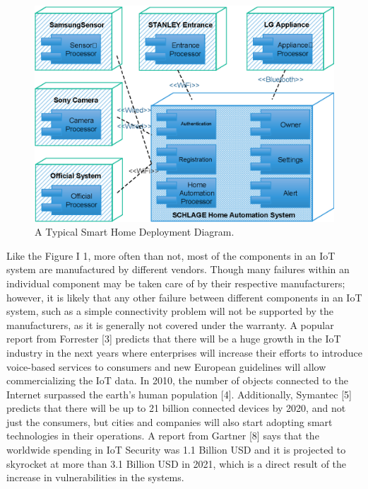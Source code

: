 \begin{figure}[h]
	\centering
	\includegraphics[width=\columnwidth]{images/shdd.eps}
	\caption{A Typical Smart Home Deployment Diagram.}
	\label{fig:SmartHomeDepDiagram}
\end{figure}

Like the Figure I 1, more often than not, most of the components in an IoT system are manufactured by different vendors. Though many failures within an individual component may be taken care of by their respective manufacturers; however, it is likely that any other failure between different components in an IoT system, such as a simple connectivity problem will not be supported by the manufacturers, as it is generally not covered under the warranty. A popular report from Forrester [3] predicts that there will be a huge growth in the IoT industry in the next years where enterprises will increase their efforts to introduce voice-based services to consumers and new European guidelines will allow commercializing the IoT data. In 2010, the number of objects connected to the Internet surpassed the earth’s human population [4]. Additionally, Symantec [5] predicts that there will be up to 21 billion connected devices by 2020, and not just the consumers, but cities and companies will also start adopting smart technologies in their operations. A report from Gartner [8] says that the worldwide spending in IoT Security was 1.1 Billion USD and it is projected to skyrocket at more than 3.1 Billion USD in 2021, which is a direct result of the increase in vulnerabilities in the systems.

